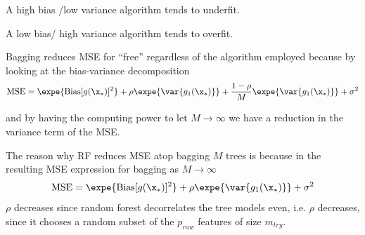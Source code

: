 \documentclass[12pt]{article}
\begin{document}
\begin{enumerate}

\begin{tcolorbox}[colback=white, sharp corners]
A high bias /low variance algorithm tends to underfit.
\end{tcolorbox}


\begin{tcolorbox}[colback=white, sharp corners]
A low bias/ high variance algorithm tends to overfit. 
\end{tcolorbox}


\begin{tcolorbox}[colback=white, sharp corners]
Bagging reduces MSE for ``free'' regardless of the algorithm employed because by looking at the bias-variance decomposition 
\[
	\text{MSE} = \expe{\text{Bias}[g(\x_*)]^2} + \rho \expe{\var{g_1(\x_*)}} +  \dfrac{1 - \rho}{M} \expe{\var{g_1(\x_*)}} +  \sigma^2
\] 

and by having the computing power to let $M \to \infty$ we have a reduction in the variance term of the MSE. 
\end{tcolorbox}


\begin{tcolorbox}[colback=white, sharp corners]
The reason why RF reduces MSE atop bagging $M$ trees is because in the resulting MSE expression for bagging as $M \to \infty$
\[
	\text{MSE} = \expe{\text{Bias}[g(\x_*)]^2} + \rho \expe{\var{g_1(\x_*)}}  +  \sigma^2
\] 
$\rho$ decreases since random forest decorrelates the tree models even, i.e. $\rho$ decreases, since it chooses a random subset of the $p_{raw}$ features of size $m_{try}.$ 
\end{tcolorbox}


\end{enumerate}
\end{document}
